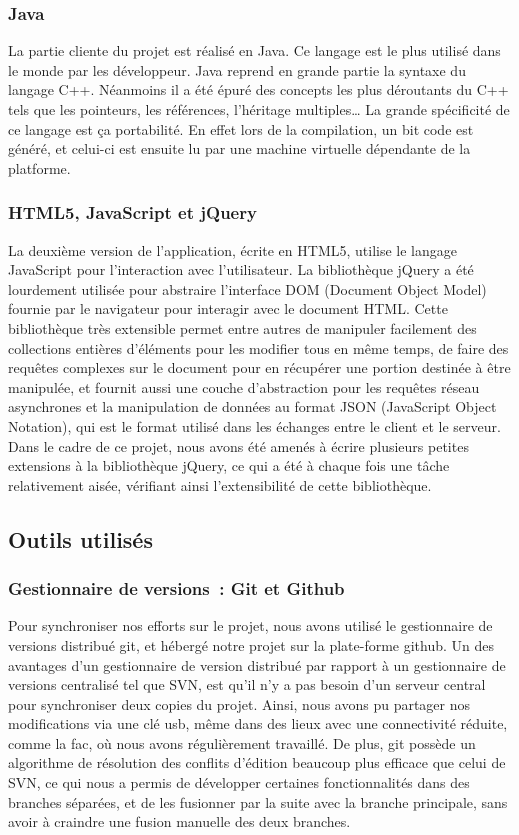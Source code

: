 \documentclass[a4paper,11pt,french]{article}
\begin{document}
{\subsubsection{Java}
La partie cliente du projet est réalisé en Java. Ce langage est le plus utilisé dans le monde par les développeur. Java reprend en grande partie la syntaxe du langage C++. Néanmoins il a été épuré des concepts les plus déroutants du C++ tels que les pointeurs, les références, l'héritage multiples\dots{} La grande spécificité de ce langage est ça portabilité. En effet lors de la compilation, un bit code est généré, et celui-ci est ensuite lu par une machine virtuelle dépendante de la platforme.

\subsubsection{HTML5, JavaScript et jQuery}

La deuxième version de l'application, écrite en HTML5, utilise le langage JavaScript pour l'interaction avec l'utilisateur. La bibliothèque jQuery a été lourdement utilisée pour abstraire l'interface DOM (Document Object Model) fournie par le navigateur pour interagir avec le document HTML. Cette bibliothèque très extensible permet entre autres de manipuler facilement des collections entières d'éléments pour les modifier tous en même temps, de faire des requêtes complexes sur le document pour en récupérer une portion destinée à être manipulée, et
fournit aussi une couche d'abstraction pour les requêtes réseau asynchrones et la manipulation de données au format JSON (JavaScript Object Notation), qui est le format utilisé dans les échanges entre le client et le serveur. Dans le cadre de ce projet, nous avons été amenés à écrire plusieurs petites extensions à la bibliothèque jQuery, ce qui a été à chaque fois une tâche relativement aisée, vérifiant ainsi l'extensibilité de cette bibliothèque.

\subsection{Outils utilisés}
\subsubsection{Gestionnaire de versions~: Git et Github}

Pour synchroniser nos efforts sur le projet, nous avons utilisé le gestionnaire de versions distribué git, et hébergé notre projet sur la plate-forme github. Un des avantages d'un gestionnaire de version distribué par rapport à un gestionnaire de versions centralisé tel que SVN, est qu'il n'y a pas besoin d'un serveur central pour synchroniser deux copies du projet. Ainsi, nous avons pu partager nos modifications via une clé usb, même dans des lieux avec une connectivité réduite, comme la fac, où nous avons régulièrement travaillé. 
De plus, git possède un algorithme de résolution des conflits d'édition beaucoup plus efficace que celui de SVN, ce qui nous a permis de développer certaines fonctionnalités dans des branches séparées, et de les fusionner par la suite avec la branche principale, sans avoir à craindre une fusion manuelle des deux branches.

}
\end{document}
